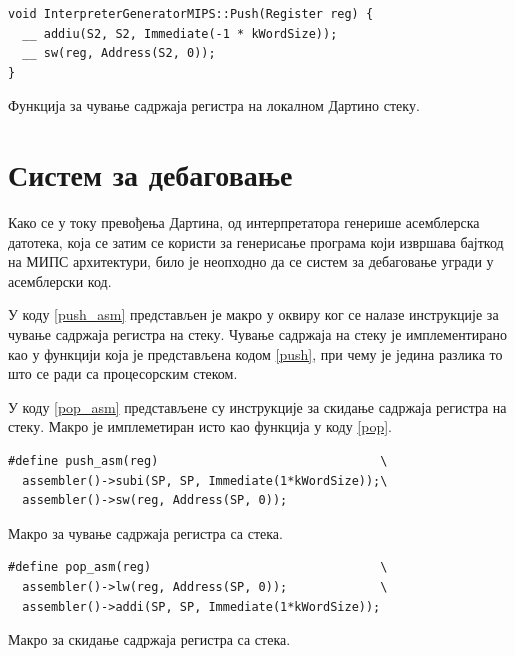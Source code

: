 \documentclass[12pt,oneside]{memoir}
\begin{document}
\begin{listing}
\begin{verbatim}
void InterpreterGeneratorMIPS::Push(Register reg) {
  __ addiu(S2, S2, Immediate(-1 * kWordSize));
  __ sw(reg, Address(S2, 0));
}
\end{verbatim}
\caption{Функција за чување садржаја регистра на локалном Дартино стеку.}
\label{push}
\end{listing}

\section{Систем за дебаговање}
\label{sec:debagovanje}
Како се у току превођења Дартина, од интерпретатора генерише асемблерска датотека, која се затим се користи за генерисање програма који извршава бајткод на МИПС архитектури, било је неопходно да се систем за дебаговање угради у асемблерски код.

У коду \ref{push_asm} представљен је макро у оквиру ког се налазе инструкције за чување садржаја регистра на стеку. Чување садржаја на стеку је имплементирано као у функцији која је представљена кодом \ref{push}, при чему је једина разлика то што се ради са процесорским стеком.

У коду \ref{pop_asm} представљене су инструкције за скидање садржаја регистра на стеку. Макро је имплеметиран исто као функција у коду \ref{pop}. 

\begin{listing}
\begin{verbatim}
#define push_asm(reg)                               \
  assembler()->subi(SP, SP, Immediate(1*kWordSize));\
  assembler()->sw(reg, Address(SP, 0));
\end{verbatim}
\caption{Макро за чување садржаја регистра са стека.}
\label{push_asm}
\end{listing}

\begin{listing}
\begin{verbatim}
#define pop_asm(reg)                                \
  assembler()->lw(reg, Address(SP, 0));             \
  assembler()->addi(SP, SP, Immediate(1*kWordSize));
\end{verbatim}
\caption{Макро за скидање садржаја регистра са стека.}
\label{pop_asm}
\end{listing}
\end{document}
